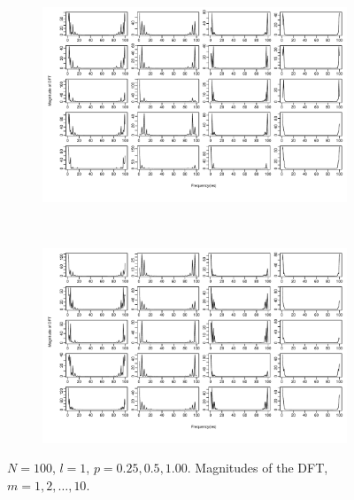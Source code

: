 \documentclass[11pt, a4paper]{article} %
\begin{document}
\begin{figure}
\begin{subfigure}{1.1\textwidth}
  \centering
  \includegraphics[width=\linewidth]{N100_MagnDFT_l1_m_1_5.pdf}
  \label{fig:sfig1}
\end{subfigure}\\
\begin{subfigure}{1.1\textwidth}
  \centering
  \includegraphics[width=\linewidth]{N100_MagnDFT_l1_m_6_10.pdf}
  \label{fig:sfig2}
\end{subfigure}
\label{fig1}
\caption{$N = 100$, $l =1$, $p = 0.25, 0.5, 1.00$. Magnitudes of the DFT, $m = 1,2, \dots, 10$.}
\end{figure}

\restoregeometry


\end{document}
